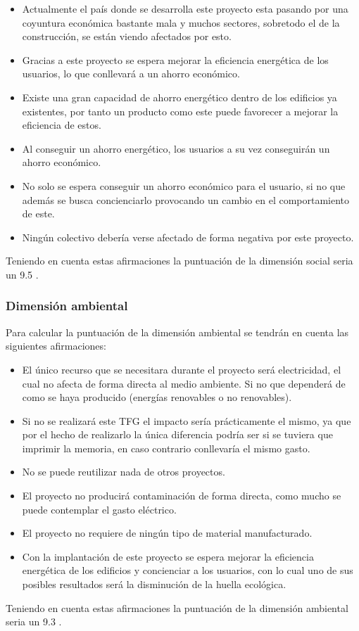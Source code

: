 \begin{itemize}
  \item Actualmente el país donde se desarrolla este proyecto esta pasando por una coyuntura económica bastante mala y muchos sectores, sobretodo el de la construcción, se están viendo afectados por esto.
  \item Gracias a este proyecto se espera mejorar la eficiencia energética de los usuarios, lo que conllevará a un ahorro económico.
  \item Existe una gran capacidad de ahorro energético dentro de los edificios ya existentes, por tanto un producto como este puede favorecer a mejorar la eficiencia de estos.
  \item Al conseguir un ahorro energético, los usuarios a su vez conseguirán un ahorro económico.
  \item No solo se espera conseguir un ahorro económico para el usuario, si no que además se busca concienciarlo provocando un cambio en el comportamiento de este.
  \item Ningún colectivo debería verse afectado de forma negativa por este proyecto.
\end{itemize}

Teniendo en cuenta estas afirmaciones la puntuación de la dimensión social seria un 9.5 .
\subsubsection{Dimensión ambiental}

Para calcular la puntuación de la dimensión ambiental se tendrán en cuenta las siguientes afirmaciones:

\begin{itemize}
  \item El único recurso que se necesitara durante el proyecto será electricidad, el cual no afecta de forma directa al medio ambiente. Si no que dependerá de como se haya producido (energías renovables o no renovables).
  \item Si no se realizará este TFG el impacto sería prácticamente el mismo, ya que por el hecho de realizarlo la única diferencia podría ser si se tuviera que imprimir la memoria, en caso contrario conllevaría el mismo gasto.
  \item No se puede reutilizar nada de otros proyectos.
  \item El proyecto no producirá contaminación de forma directa, como mucho se puede contemplar el gasto eléctrico.
  \item El proyecto no requiere de ningún tipo de material manufacturado.
  \item Con la implantación de este proyecto se espera mejorar la eficiencia energética de los edificios y concienciar a los usuarios, con lo cual uno de sus posibles resultados será la disminución de la huella ecológica.
\end{itemize}

Teniendo en cuenta estas afirmaciones la puntuación de la dimensión ambiental seria un 9.3 .
